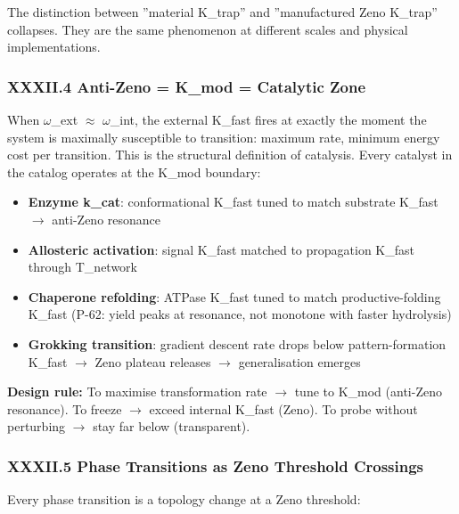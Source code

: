 \documentclass[12pt,a4paper]{article}
\begin{document}
The distinction between ''material K\_trap'' and ''manufactured Zeno K\_trap'' collapses. They are the same phenomenon at different scales and physical implementations.

\subsubsection{XXXII.4 Anti-Zeno = K\_mod = Catalytic Zone}

When $\omega$\_ext $\approx$ $\omega$\_int, the external K\_fast fires at exactly the moment the system is maximally susceptible to transition: maximum rate, minimum energy cost per transition. This is the structural definition of catalysis. Every catalyst in the catalog operates at the K\_mod boundary:

\begin{itemize}
    \item \textbf{Enzyme k\_cat}: conformational K\_fast tuned to match substrate K\_fast $\rightarrow$ anti-Zeno resonance
    \item \textbf{Allosteric activation}: signal K\_fast matched to propagation K\_fast through T\_network
    \item \textbf{Chaperone refolding}: ATPase K\_fast tuned to match productive-folding K\_fast (P-62: yield peaks at resonance, not monotone with faster hydrolysis)
    \item \textbf{Grokking transition}: gradient descent rate drops below pattern-formation K\_fast $\rightarrow$ Zeno plateau releases $\rightarrow$ generalisation emerges
\end{itemize}

\textbf{Design rule:} To maximise transformation rate $\rightarrow$ tune to K\_mod (anti-Zeno resonance). To freeze $\rightarrow$ exceed internal K\_fast (Zeno). To probe without perturbing $\rightarrow$ stay far below (transparent).

\subsubsection{XXXII.5 Phase Transitions as Zeno Threshold Crossings}

Every phase transition is a topology change at a Zeno threshold:
\end{document}
